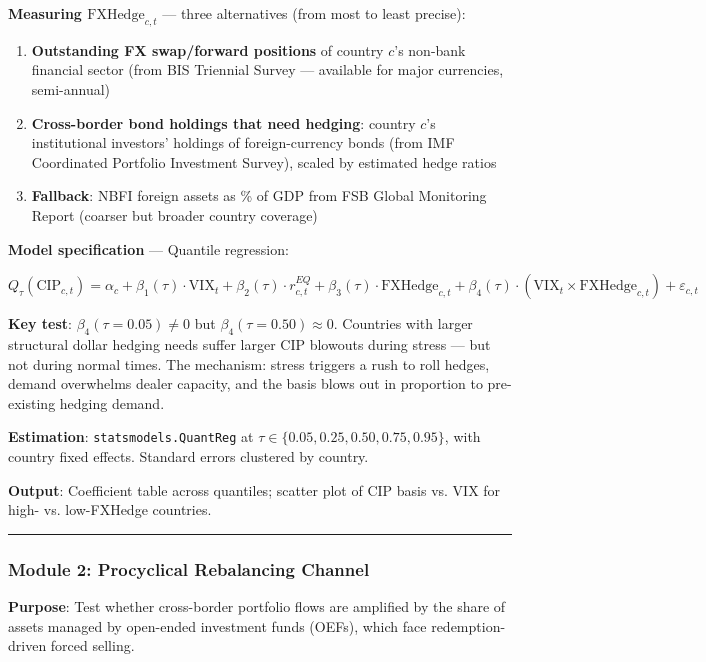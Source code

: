 \documentclass[11pt,a4paper]{article}
\begin{document}
\textbf{Measuring $\text{FXHedge}_{c,t}$} --- three alternatives (from most to least precise):
\begin{enumerate}
\item \textbf{Outstanding FX swap/forward positions} of country $c$'s non-bank financial sector (from BIS Triennial Survey --- available for major currencies, semi-annual)
\item \textbf{Cross-border bond holdings that need hedging}: country $c$'s institutional investors' holdings of foreign-currency bonds (from IMF Coordinated Portfolio Investment Survey), scaled by estimated hedge ratios
\item \textbf{Fallback}: NBFI foreign assets as \% of GDP from FSB Global Monitoring Report (coarser but broader country coverage)

\end{enumerate}
\textbf{Model specification} --- Quantile regression:

\[Q_\tau(\text{CIP}_{c,t}) = \alpha_c + \beta_1(\tau) \cdot \text{VIX}_t + \beta_2(\tau) \cdot r_{c,t}^{EQ} + \beta_3(\tau) \cdot \text{FXHedge}_{c,t} + \beta_4(\tau) \cdot (\text{VIX}_t \times \text{FXHedge}_{c,t}) + \varepsilon_{c,t}\]

\textbf{Key test}: $\beta_4(\tau = 0.05) \neq 0$ but $\beta_4(\tau = 0.50) \approx 0$. Countries with larger structural dollar hedging needs suffer larger CIP blowouts during stress --- but not during normal times. The mechanism: stress triggers a rush to roll hedges, demand overwhelms dealer capacity, and the basis blows out in proportion to pre-existing hedging demand.

\textbf{Estimation}: \texttt{statsmodels.QuantReg} at $\tau \in \{0.05, 0.25, 0.50, 0.75, 0.95\}$, with country fixed effects. Standard errors clustered by country.

\textbf{Output}: Coefficient table across quantiles; scatter plot of CIP basis vs. VIX for high- vs. low-FXHedge countries.


\bigskip\noindent\rule{\textwidth}{0.4pt}\bigskip


\subsubsection{Module 2: Procyclical Rebalancing Channel}

\textbf{Purpose}: Test whether cross-border portfolio flows are amplified by the share of assets managed by open-ended investment funds (OEFs), which face redemption-driven forced selling.
\end{document}
